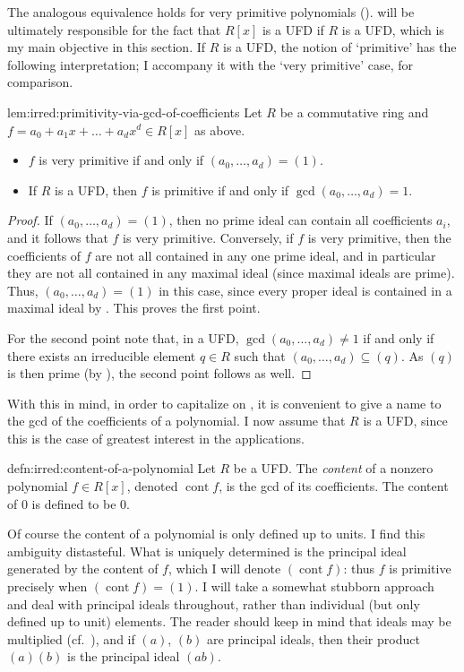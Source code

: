 The analogous equivalence holds for very primitive polynomials
().
 will be ultimately responsible for the fact that
$R[x]$ is a UFD if $R$ is a UFD, which is my main objective in this
section. If $R$ is a UFD, the notion of `primitive' has the following
interpretation; I accompany it with the `very primitive' case, for
comparison.
\begin{lem}{}{lem:irred:primitivity-via-gcd-of-coefficients}
  Let $R$ be a commutative ring and
  $f = a_0 + a_1 x + \dots + a_d x^d \in R[x]$ as above.
  \begin{itemize}
  \item $f$ is very primitive if and only if
    $(a_0, \dots, a_d) = (1)$.
  \item If $R$ is a UFD, then $f$ is primitive if and only if
    $\gcd(a_0, \dots, a_d) = 1$.
  \end{itemize}
\end{lem}
\begin{proof}
  If $(a_0, \dots, a_d) = (1)$, then no prime ideal can contain all
  coefficients $a_i$, and it follows that $f$ is very primitive.
  Conversely, if $f$ is very primitive, then the coefficients of $f$
  are not all contained in any one prime ideal, and in particular they
  are not all contained in any maximal ideal (since maximal ideals are
  prime).  Thus, $(a_0, \dots, a_d) = (1)$ in this case, since every
  proper ideal is contained in a maximal ideal by
  . This proves the first point.

  For the second point note that, in a UFD,
  $\gcd(a_0, \dots, a_d) \neq 1$ if and only if there exists an
  irreducible element $q \in R$ such that
  $(a_0, \dots, a_d) \subseteq (q)$. As $(q)$ is then prime (by
  ), the second point follows as well.
\end{proof}
With this in mind, in order to capitalize on , it
is convenient to give a name to the gcd of the coefficients of a
polynomial. I now assume that $R$ is a UFD, since this is the case of
greatest interest in the applications.

\begin{defn}{}{defn:irred:content-of-a-polynomial}
  Let $R$ be a UFD. The \emph{content} of a nonzero polynomial
  $f \in R[x]$, denoted $\operatorname{cont} f$, is the gcd of its
  coefficients. The content of $0$ is defined to be $0$.
\end{defn}
Of course the content of a polynomial is only defined up to units. I
find this ambiguity distasteful. What is uniquely determined is the
principal ideal generated by the content of $f$, which I will denote
$(\operatorname{cont} f)$: thus $f$ is primitive precisely when
$(\operatorname{cont} f) = (1)$. I will take a somewhat stubborn
approach and deal with principal ideals throughout, rather than
individual (but only defined up to unit) elements. The reader should
keep in mind that ideals may be multiplied (cf.\
), and if $(a)$, $(b)$ are
principal ideals, then their product $(a)(b)$ is the principal ideal
$(ab)$.

